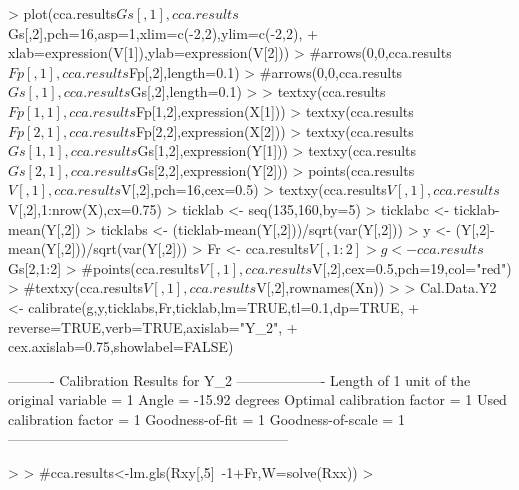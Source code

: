 \documentclass[a4paper]{article}
\begin{document}
\begin{Schunk}
\begin{Sinput}
> plot(cca.results$Gs[,1],cca.results$Gs[,2],pch=16,asp=1,xlim=c(-2,2),ylim=c(-2,2),
+      xlab=expression(V[1]),ylab=expression(V[2]))
> #arrows(0,0,cca.results$Fp[,1],cca.results$Fp[,2],length=0.1)
> #arrows(0,0,cca.results$Gs[,1],cca.results$Gs[,2],length=0.1)
> 
> textxy(cca.results$Fp[1,1],cca.results$Fp[1,2],expression(X[1]))
> textxy(cca.results$Fp[2,1],cca.results$Fp[2,2],expression(X[2]))
> textxy(cca.results$Gs[1,1],cca.results$Gs[1,2],expression(Y[1]))
> textxy(cca.results$Gs[2,1],cca.results$Gs[2,2],expression(Y[2]))
> points(cca.results$V[,1],cca.results$V[,2],pch=16,cex=0.5)
> textxy(cca.results$V[,1],cca.results$V[,2],1:nrow(X),cx=0.75)
> ticklab  <- seq(135,160,by=5)                           
> ticklabc <- ticklab-mean(Y[,2])
> ticklabs <- (ticklab-mean(Y[,2]))/sqrt(var(Y[,2]))
> y <- (Y[,2]-mean(Y[,2]))/sqrt(var(Y[,2]))                      
> Fr <- cca.results$V[,1:2]                                         
> g <- cca.results$Gs[2,1:2]                                        
> #points(cca.results$V[,1],cca.results$V[,2],cex=0.5,pch=19,col="red")
> #textxy(cca.results$V[,1],cca.results$V[,2],rownames(Xn))
> 
> Cal.Data.Y2 <- calibrate(g,y,ticklabs,Fr,ticklab,lm=TRUE,tl=0.1,dp=TRUE,
+                          reverse=TRUE,verb=TRUE,axislab="Y_2",
+                          cex.axislab=0.75,showlabel=FALSE)
\end{Sinput}
\begin{Soutput}
---------- Calibration Results for  Y_2  -------------------
Length of 1 unit of the original variable =  1  
Angle                                     =  -15.92 degrees
Optimal calibration factor                =  1  
Used calibration factor                   =  1  
Goodness-of-fit                           =  1  
Goodness-of-scale                         =  1  
------------------------------------------------------------
\end{Soutput}
\begin{Sinput}
> 
> #cca.results<-lm.gls(Rxy[,5]~-1+Fr,W=solve(Rxx))
> 
\end{Sinput}
\end{Schunk}
\end{document}
